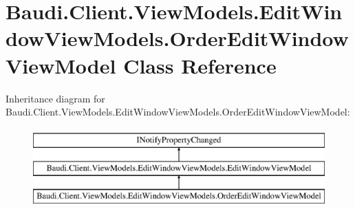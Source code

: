 \hypertarget{class_baudi_1_1_client_1_1_view_models_1_1_edit_window_view_models_1_1_order_edit_window_view_model}{}\section{Baudi.\+Client.\+View\+Models.\+Edit\+Window\+View\+Models.\+Order\+Edit\+Window\+View\+Model Class Reference}
\label{class_baudi_1_1_client_1_1_view_models_1_1_edit_window_view_models_1_1_order_edit_window_view_model}
Inheritance diagram for Baudi.\+Client.\+View\+Models.\+Edit\+Window\+View\+Models.\+Order\+Edit\+Window\+View\+Model\+:\begin{figure}[H]
\begin{center}
\leavevmode
\includegraphics[height=3.000000cm]{class_baudi_1_1_client_1_1_view_models_1_1_edit_window_view_models_1_1_order_edit_window_view_model}
\end{center}
\end{figure}
